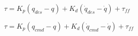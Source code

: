 \documentclass{article}
\begin{document}
$ \tau = K_p (q_{des} - q) + K_d (\dot{q}_{des} - \dot{q}) + \tau_{ff} $
\pagebreak

$ \tau = K_p (q_{cmd} - q) + K_d (\dot{q}_{cmd} - \dot{q}) + \tau_{ff} $
\pagebreak
\end{document}
